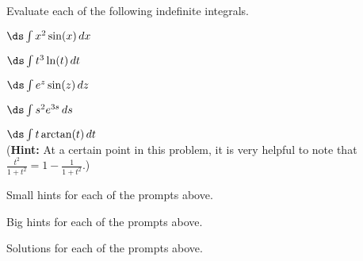 \begin{activity} \label{A:5.4.3}  Evaluate each of the following indefinite integrals.

\ba
	\item $\ds \int x^2 \sin(x) \, dx$
	\item $\ds \int t^3 \ln(t) \, dt$
	\item $\ds \int e^z \sin(z) \, dz$
	\item $\ds \int s^2 e^{3s} \, ds$
	\item $\ds \int t \arctan(t) \,dt$ \\ ({\bf Hint:} At a certain point in this problem, it is very helpful to note that $\frac{t^2}{1+t^2} = 1 - \frac{1}{1+t^2}.$)
\ea
\end{activity}
\begin{smallhint}
\ba
	\item Small hints for each of the prompts above.
\ea
\end{smallhint}
\begin{bighint}
\ba
	\item Big hints for each of the prompts above.
\ea
\end{bighint}
\begin{activitySolution}
\ba
	\item Solutions for each of the prompts above.
\ea
\end{activitySolution}
\aftera